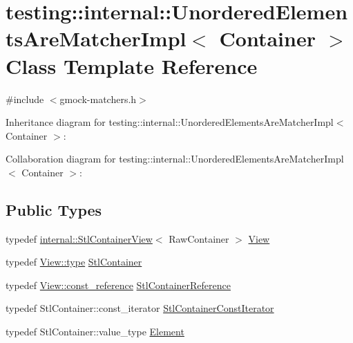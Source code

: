 \hypertarget{classtesting_1_1internal_1_1_unordered_elements_are_matcher_impl}{}\section{testing\+:\+:internal\+:\+:Unordered\+Elements\+Are\+Matcher\+Impl$<$ Container $>$ Class Template Reference}
\label{classtesting_1_1internal_1_1_unordered_elements_are_matcher_impl}


{\ttfamily \#include $<$gmock-\/matchers.\+h$>$}



Inheritance diagram for testing\+:\+:internal\+:\+:Unordered\+Elements\+Are\+Matcher\+Impl$<$ Container $>$\+:


Collaboration diagram for testing\+:\+:internal\+:\+:Unordered\+Elements\+Are\+Matcher\+Impl$<$ Container $>$\+:
\subsection*{Public Types}
\begin{DoxyCompactItemize}
\item 
typedef \hyperlink{classtesting_1_1internal_1_1_stl_container_view}{internal\+::\+Stl\+Container\+View}$<$ Raw\+Container $>$ \hyperlink{classtesting_1_1internal_1_1_unordered_elements_are_matcher_impl_adbd6dfef7713dd30d569b4220eb808d3}{View}
\item 
typedef \hyperlink{classtesting_1_1internal_1_1_stl_container_view_a2b2c63a6dcdbfe63fb0ee121ebf463ba}{View\+::type} \hyperlink{classtesting_1_1internal_1_1_unordered_elements_are_matcher_impl_a6c23354dfe53bb47fa3d38d2869e273c}{Stl\+Container}
\item 
typedef \hyperlink{classtesting_1_1internal_1_1_stl_container_view_a9cd4f6ed689b3938cdb7b3c4cbf1b36b}{View\+::const\+\_\+reference} \hyperlink{classtesting_1_1internal_1_1_unordered_elements_are_matcher_impl_acf64d0e328361d4796bcf1aeb91ed975}{Stl\+Container\+Reference}
\item 
typedef Stl\+Container\+::const\+\_\+iterator \hyperlink{classtesting_1_1internal_1_1_unordered_elements_are_matcher_impl_a656c30399e17043db476b639dcd4e6fa}{Stl\+Container\+Const\+Iterator}
\item 
typedef Stl\+Container\+::value\+\_\+type \hyperlink{classtesting_1_1internal_1_1_unordered_elements_are_matcher_impl_ad62ba6ff582afe086d522951f94e30d0}{Element}
\end{DoxyCompactItemize}
